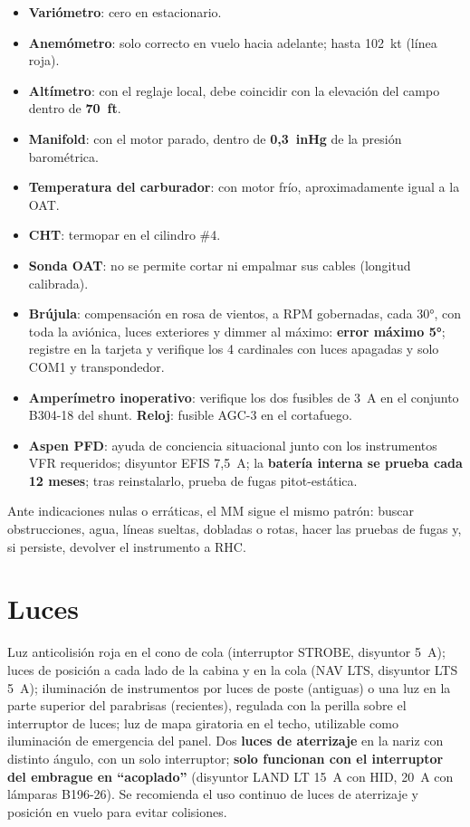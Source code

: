 \begin{itemize}
\item \textbf{Variómetro}: cero en estacionario.
\item \textbf{Anemómetro}: solo correcto en vuelo hacia adelante; hasta 102~kt (línea roja).
\item \textbf{Altímetro}: con el reglaje local, debe coincidir con la elevación del campo dentro de \textbf{70~ft}.
\item \textbf{Manifold}: con el motor parado, dentro de \textbf{0,3~inHg} de la presión barométrica.
\item \textbf{Temperatura del carburador}: con motor frío, aproximadamente igual a la OAT.
\item \textbf{CHT}: termopar en el cilindro \#4.
\item \textbf{Sonda OAT}: no se permite cortar ni empalmar sus cables (longitud calibrada).
\item \textbf{Brújula}: compensación en rosa de vientos, a RPM gobernadas, cada 30°, con toda la aviónica, luces exteriores y dimmer al máximo: \textbf{error máximo 5°}; registre en la tarjeta y verifique los 4 cardinales con luces apagadas y solo COM1 y transpondedor.
\item \textbf{Amperímetro inoperativo}: verifique los dos fusibles de 3~A en el conjunto B304-18 del shunt. \textbf{Reloj}: fusible AGC-3 en el cortafuego.
\item \textbf{Aspen PFD}: ayuda de conciencia situacional junto con los instrumentos VFR requeridos; disyuntor EFIS 7,5~A; la \textbf{batería interna se prueba cada 12 meses}; tras reinstalarlo, prueba de fugas pitot-estática.
\end{itemize}

Ante indicaciones nulas o erráticas, el MM sigue el mismo patrón: buscar obstrucciones, agua, líneas sueltas, dobladas o rotas, hacer las pruebas de fugas y, si persiste, devolver el instrumento a RHC.

\section{Luces}

Luz anticolisión roja en el cono de cola (interruptor STROBE, disyuntor 5~A); luces de posición a cada lado de la cabina y en la cola (NAV LTS, disyuntor LTS 5~A); iluminación de instrumentos por luces de poste (antiguas) o una luz en la parte superior del parabrisas (recientes), regulada con la perilla sobre el interruptor de luces; luz de mapa giratoria en el techo, utilizable como iluminación de emergencia del panel. Dos \textbf{luces de aterrizaje} en la nariz con distinto ángulo, con un solo interruptor; \textbf{solo funcionan con el interruptor del embrague en ``acoplado''} (disyuntor LAND LT 15~A con HID, 20~A con lámparas B196-26). Se recomienda el uso continuo de luces de aterrizaje y posición en vuelo para evitar colisiones.

